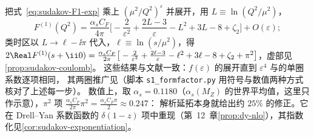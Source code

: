 把式~\eqref{eq:sudakov-F1-exp} 乘上 $(\mu^2/Q^2)^\varepsilon$ 并展开，用 $L\equiv\ln(Q^2/\mu^2)$，
\begin{equation}\label{eq:sudakov-F1-L}
F^{(1)}(Q^2)=\frac{\alpha_sC_F}{4\pi}\Big[-\frac2{\varepsilon^2}+\frac{2L-3}{\varepsilon}-L^2+3L-8+\zeta_2\Big]+O(\varepsilon);
\end{equation}
类时区以 $L\to\ell-\ii\pi$ 代入，$\ell\equiv\ln(s/\mu^2)$，得
$2\Real F^{(1)}(s+\ii0)=\frac{\alpha_sC_F}{2\pi}\big[-\frac2{\varepsilon^2}+\frac{2\ell-3}{\varepsilon}-\ell^2+3\ell-8+\zeta_2+\pi^2\big]$，虚部见\cref{prop:sudakov-coulomb}。
这些结果与文献一致：$f(\varepsilon)$ 的展开直到 $\varepsilon^4$ 与\cite[式~(3.5)]{MochVermaserenVogt2005}的单圈系数逐项相同，
其两圈推广见\cite{Gonsalves1983}（脚本 \texttt{s1\_formfactor.py} 用符号与数值两种方式核对了上述每一步）。
数值上，取 $\alpha_s=0.1180$（$\alpha_s(M_Z)$ 的世界平均值\cite{ParticleDataGroup:2024cfk}，这里只作示意），$\pi^2$ 项 $\frac{\alpha_sC_F}{2\pi}\pi^2=\frac{\alpha_sC_F\pi}{2}\approx0.247$：
解析延拓本身就给出约 $25\%$ 的修正。它在 Drell--Yan 系数函数的 $\delta(1-z)$ 项中重现（第~12~章\cref{prop:dy-nlo}），其指数化见\cref{cor:sudakov-exponentiation}。
